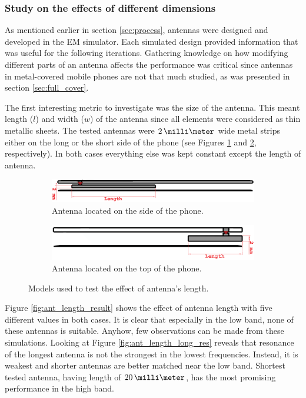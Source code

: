 \subsubsection{Study on the effects of different dimensions}
\label{sec:dimension_study}
As mentioned earlier in section \ref{sec:process}, antennas were designed and developed in the EM simulator. Each simulated design provided information that was useful for the following iterations. Gathering knowledge on how modifying different parts of an antenna affects the performance was critical since antennas in metal-covered mobile phones are not that much studied, as was presented in section \ref{sec:full_cover}.

The first interesting metric to investigate was the size of the antenna. This meant length ($l$) and width ($w$) of the antenna since all elements were considered as thin metallic sheets. The tested antennas were $2\,\milli\meter$ wide metal strips either on the long or the short side of the phone (see Figures \ref{fig:ant_length_long} and \ref{fig:ant_length_short}, respectively). In both cases everything else was kept constant except the length of antenna. 

\begin{figure}[H]
    \centering
    \begin{subfigure}[b]{0.49\textwidth}
        \includegraphics[width=\textwidth]{img/ant_length_long.eps}
        \caption{Antenna located on the side of the phone.}
        \label{fig:ant_length_long}
    \end{subfigure}
    \begin{subfigure}[b]{0.49\textwidth}
        \includegraphics[width=\textwidth]{img/ant_length_short.eps}
        \caption{Antenna located on the top of the phone.}
        \label{fig:ant_length_short}
    \end{subfigure}
    \caption{Models used to test the effect of antenna's length.}
    \label{fig:ant_length_model}
\end{figure}

Figure \ref{fig:ant_length_result} shows the effect of antenna length with five different values in both cases. It is clear that especially in the low band, none of these antennas is suitable. Anyhow, few observations can be made from these simulations. Looking at Figure \ref{fig:ant_length_long_res} reveals that resonance of the longest antenna is not the strongest in the lowest frequencies. Instead, it is weakest and shorter antennas are better matched near the low band. Shortest tested antenna, having length of $20\,\milli\meter$, has the most promising performance in the high band.

